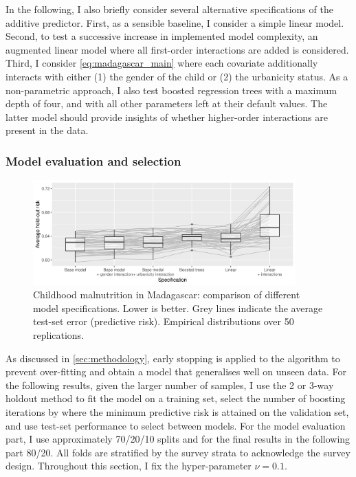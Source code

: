 In the following, I also briefly consider several alternative specifications of the additive predictor. First, as a sensible baseline, I consider a simple linear model. Second, to test a successive increase in implemented model complexity, an augmented linear model where all first-order interactions are added is considered. Third, I consider \autoref{eq:madagascar_main} where each covariate additionally interacts with either (1) the gender of the child or (2) the urbanicity status. As a non-parametric approach, I also test boosted regression trees with a maximum depth of four, and with all other parameters left at their default values. The latter model should provide insights of whether higher-order interactions are present in the data.


\subsubsection*{Model evaluation and selection}

\begin{figure}[t!]
	\centering
	\includegraphics[width=0.9\textwidth, keepaspectratio]{figures/madagascar_modelselection.png}
	\caption{Childhood malnutrition in Madagascar: comparison of different model specifications. Lower is better. Grey lines indicate the average test-set error (predictive risk). Empirical distributions over 50 replications.}
	\label{fig:madagascar_modelselection}	
\end{figure}

As discussed in \autoref{sec:methodology}, early stopping is applied to the algorithm to prevent over-fitting and obtain a model that generalises well on unseen data. For the following results, given the larger number of samples, I use the 2 or 3-way holdout method to fit the model on a training set, select the number of boosting iterations by where the minimum predictive risk is attained on the validation set, and use test-set performance to select between models. For the model evaluation part, I use approximately 70/20/10 splits and for the final results in the following part 80/20. All folds are stratified by the survey strata to acknowledge the survey design. Throughout this section, I fix the hyper-parameter $\nu = 0.1$.

